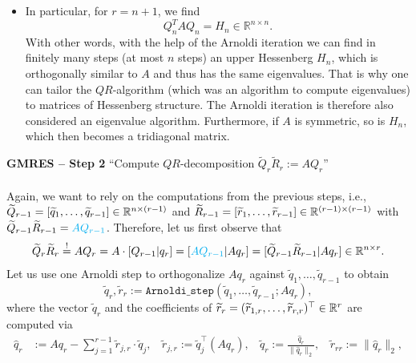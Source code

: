 \begin{frame}
\begin{itemize}
	\item		In particular, for $r=n+1$, we find
			$$
			Q_n^TAQ_n=H_n\in\mathbb{R}^{n\times n}.
			$$
			With other words, with the help of the Arnoldi iteration we can find in finitely many steps (at most $n$ steps) an upper Hessenberg $H_n$, which is orthogonally similar to $A$ and thus has the same eigenvalues. That is why one can tailor the $QR$-algorithm (which was an algorithm to compute eigenvalues) to matrices of Hessenberg structure. The Arnoldi iteration is therefore also considered an eigenvalue algorithm. Furthermore, if $A$ is symmetric, so is $H_n$, which then becomes a tridiagonal matrix.
\end{itemize}

\end{frame}

\begin{frame}
 \textbf{GMRES -- Step 2}
 ``Compute $QR$-decomposition $\widetilde{Q}_r\widetilde{R}_r:=AQ_r$''
 ~\\~\\
Again, we want to rely on the computations from the previous steps, i.e., $\widetilde{Q}_{r-1} = [\widetilde{q}_{1},\ldots,\widetilde{q}_{r-1}] \in {\mathbb{R}}^{n \times (r-1)}$ and $\widetilde{R}_{r-1} = [\widetilde{r}_{1},\ldots,\widetilde{r}_{r-1}]\in {\mathbb{R}}^{(r-1) \times(r-1)}$ with $   \widetilde{Q}_{r-1}\widetilde{R}_{r-1}={\color{cyan}AQ_{r-1} }$. Therefore, let us first observe that
\begin{align*}
\widetilde{Q}_r\widetilde{R}_r\stackrel{!}{=}AQ_r
=A\cdot[Q_{r-1}|q_r]=[{\color{cyan}AQ_{r-1} }|Aq_r]
=[\widetilde{Q}_{r-1}\widetilde{R}_{r-1}|Aq_r]  \in {\mathbb{R}}^{n \times r}.
\end{align*}
Let us use one Arnoldi step to orthogonalize $Aq_r$ against $\widetilde{q}_1,\dots,\widetilde{q}_{r-1}$ to obtain
$$\widetilde{q}_r,\widetilde{r}_r :=  \texttt{Arnoldi\_step} (\widetilde{q}_1,\dots,\widetilde{q}_{r-1};Aq_r),$$
where the vector $\widetilde{q}_r$ and the coefficients of $\widetilde{r}_r = (\widetilde{r}_{1,r},\ldots, \widetilde{r}_{r,r})^\top \in {\mathbb{R}}^r$ are computed via
\begin{align*}
\widehat{q}_r&:=Aq_r-\sum_{j=1}^{r-1} \widetilde{r}_{j,r}\cdot \widetilde{q}_j,~~~~\widetilde{r}_{j,r} :=\widetilde{q}_j^\top(Aq_r) ,~~~~\widetilde{q}_r:=\frac{\widehat{q}_r}{\|\widehat{q}_r\|_2}, ~~~~\widetilde{r}_{rr}:=\|\widehat{q}_r\|_2,

\end{align*}
\end{frame}
